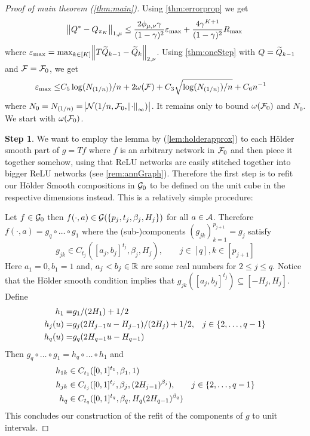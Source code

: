 
\begin{proof}[Proof of main theorem (\ref{thm:main})] %
  Using \cref{thm:errorprop} we get
  \begin{equation}
    \norm{Q^* - Q_{\pi_K}}_{1,\mu} \leq
    \frac{2 \phi_{\mu, \nu} \gamma}{(1-\gamma)^2}\varepsilon_{\max} +
    \frac{4 \gamma^{K+1}}{(1-\gamma)^2} R_{\max}
    \label{eq:mp1}
  \end{equation}
  where $\varepsilon_{\max} =
  \max_{k \in [K]} \norm{T \widetilde{Q}_{k-1} - \widetilde{Q}_k}_{2, \nu}$.
  Using \cref{thm:oneStep} with $Q = \widetilde{Q}_{k-1}$ and
  $\mathcal{F} = \mathcal{F}_0$, we get
  \begin{align}
    \varepsilon_{\max} \leq & 
    C_5 \log(N_{(1/n)})/n
    + 2 \omega(\mathcal{F})
    + C_3 \sqrt{\log(N_{(1/n)})/n} + C_6 n^{-1}
    \label{eq:mp2}
  \end{align}
  where $N_0 = N_{(1/n)} = \abs{\mathcal{N}(1/n, \mathcal{F}_0, \norm{\cdot}_\infty)}$.
  It remains only to bound $\omega(\mathcal{F}_0)$ and $N_0$.
  We start with $\omega(\mathcal{F}_0)$.

  \textbf{Step 1}.
  We want to employ the lemma by 
  (\cref{lem:holderapprox})
  to each Hölder smooth part of $g = Tf$ where $f$ is an arbitrary network
  in $\mathcal{F}_0$
  and then piece it together somehow,
  using that ReLU networks are easily stitched together into bigger
  ReLU networks (see \cref{rem:annGraph}).
  Therefore the first step is to refit our
  Hölder Smooth compositions in $\mathcal{G}_0$ to be defined on the unit cube in
  the respective dimensions instead.
  This is a relatively simple procedure:

  Let $f \in \mathcal{G}_0$ then $f(\cdot, a) \in
  \mathcal{G}(\{p_j, t_j, \beta_j, H_j\})$ for all $a \in \mathcal{A}$.
  Therefore $f(\cdot, a) = g_q \circ \dots \circ g_1$ where
  the (sub-)components $(g_{jk})_{k=1}^{p_{j+1}} = g_j$ satisfy
  \begin{equation}
    g_{jk} \in C_{t_j}([a_j, b_j]^{t_j}, \beta_j, H_j)
    , \qquad j \in [q], k \in [p_{j+1}]
  \end{equation}
  Here $a_1 = 0, b_1=1$ and,
  $a_j < b_j \in \mathbb{R}$ are some real numbers for $2 \leq j \leq q$.
  Notice that the Hölder smooth condition implies that
  $g_{jk}([a_j, b_j]^{t_j}) \subseteq [-H_j, H_j]$.
  Define
  \begin{align}
    h_1 = & g_1/(2H_1) + 1/2 \notag
    \\ h_j(u) = & g_j(2H_{j-1} u - H_{j-1})/(2H_j) + 1/2,
    & j \in \{2, \dots, q-1\} \notag
    \\ h_q(u) = & g_q(2H_{q-1}u - H_{q-1})
  \end{align}
  Then $g_q \circ \dots \circ g_1 = h_q \circ \dots \circ h_1$ and
  \begin{align}
    h_{1k} \in &\; C_{t_1}([0,1]^{t_1}, \beta_1, 1) \notag
    \\ h_{jk} \in &\; C_{t_j}([0,1]^{t_j}, \beta_j, (2H_{j-1})^{\beta_j}),
    & j \in \{2, \dots, q-1\} \notag
    \\ h_q \in &\; C_{t_q}([0,1]^{t_q}, \beta_q, H_q(2H_{q-1})^{\beta_q})
  \end{align}
  This concludes our construction of the refit of the components of $g$
  to unit intervals.


\end{proof}
